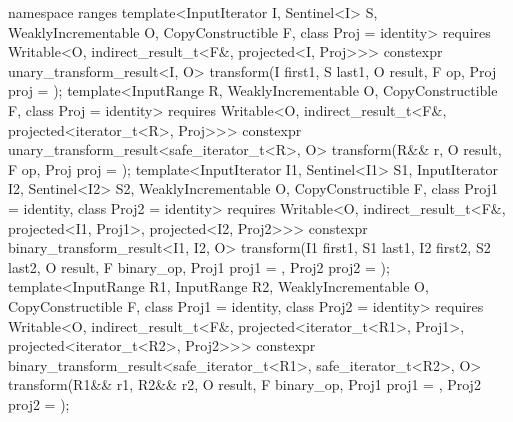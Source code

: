 \begin{itemdecl}
namespace ranges {
  template<InputIterator I, Sentinel<I> S, WeaklyIncrementable O,
           CopyConstructible F, class Proj = identity>
    requires Writable<O, indirect_result_t<F&, projected<I, Proj>>>
    constexpr unary_transform_result<I, O>
      transform(I first1, S last1, O result, F op, Proj proj = {});
  template<InputRange R, WeaklyIncrementable O, CopyConstructible F,
           class Proj = identity>
    requires Writable<O, indirect_result_t<F&, projected<iterator_t<R>, Proj>>>
    constexpr unary_transform_result<safe_iterator_t<R>, O>
      transform(R&& r, O result, F op, Proj proj = {});
  template<InputIterator I1, Sentinel<I1> S1, InputIterator I2, Sentinel<I2> S2,
           WeaklyIncrementable O, CopyConstructible F, class Proj1 = identity,
           class Proj2 = identity>
    requires Writable<O, indirect_result_t<F&, projected<I1, Proj1>,
                                           projected<I2, Proj2>>>
    constexpr binary_transform_result<I1, I2, O>
      transform(I1 first1, S1 last1, I2 first2, S2 last2, O result,
                F binary_op, Proj1 proj1 = {}, Proj2 proj2 = {});
  template<InputRange R1, InputRange R2, WeaklyIncrementable O,
           CopyConstructible F, class Proj1 = identity, class Proj2 = identity>
    requires Writable<O, indirect_result_t<F&, projected<iterator_t<R1>, Proj1>,
                                           projected<iterator_t<R2>, Proj2>>>
    constexpr binary_transform_result<safe_iterator_t<R1>, safe_iterator_t<R2>, O>
      transform(R1&& r1, R2&& r2, O result,
                F binary_op, Proj1 proj1 = {}, Proj2 proj2 = {});
}
\end{itemdecl}


